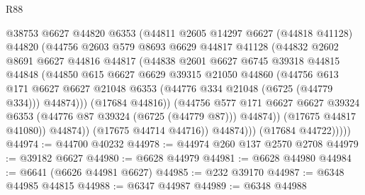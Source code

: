 \begin{lexlean}{R88}
\begin{coremodule}
                        @38753
                        @6627
                        @44820
                        @6353
                        (@44811
                          @2605
                          @14297
                          @6627
                          (@44818 @41128)
                          @44820
                          (@44756
                            @2603
                            @579
                            @8693
                            @6629
                            @44817
                            @41128
                            (@44832
                              @2602
                              @8691
                              @6627
                              @44816
                              @44817
                              (@44838
                                @2601
                                @6627
                                @6745
                                @39318
                                @44815
                                @44848
                                (@44850
                                  @615
                                  @6627
                                  @6629
                                  @39315
                                  @21050
                                  @44860
                                  (@44756
                                    @613
                                    @171
                                    @6627
                                    @6627
                                    @21048
                                    @6353
                                    (@44776 @334 @21048 (@6725 (@44779 @334)))
                                    @44874)))
                              (@17684 @44816))
                            (@44756
                              @577
                              @171
                              @6627
                              @6627
                              @39324
                              @6353
                              (@44776 @87 @39324 (@6725 (@44779 @87)))
                              @44874))
                          (@17675 @44817 @41080))
                        @44874))
                    (@17675 @44714 @44716))
                  @44874)))
            (@17684 @44722)))))
@44974 := @44700 @40232
@44978 := @44974 @260 @137 @2570 @2708
@44979 := @39182 @6627
@44980 := @6628 @44979
@44981 := @6628 @44980
@44984 := @6641 (@6626 @44981 @6627)
@44985 := @232 @39170
@44987 := @6348 @44985 @44815
@44988 := @6347 @44987
@44989 := @6348 @44988

\end{coremodule}
\end{lexlean}
